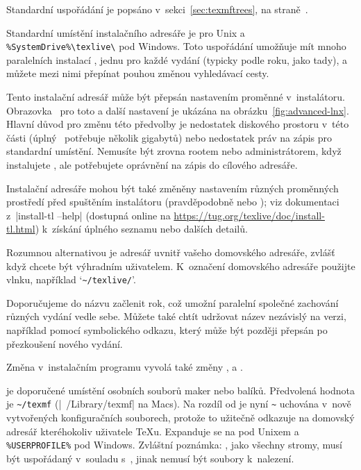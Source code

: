 \documentclass[\classoptions,slovak,english,czech]{\classname}
\def\p.{na straně~}
\begin{document}
Standardní uspořádání je popsáno v~sekci~\ref{sec:texmftrees},
\p.\pageref{sec:texmftrees}. 

Standardní umístění instalačního adresáře je
 pro Unix
a \verb|%SystemDrive%\texlive\|\dirname{\thisyear} pod Windows.
Toto uspořádání umožňuje mít mnoho paralelních instalací \TL, jednu pro každé vydání
(typicky podle roku, jako tady),
a můžete mezi nimi přepínat pouhou změnou vyhledávací cesty.

Tento instalační adresář může být přepsán nastavením proměnné  v~instalátoru.
Obrazovka \GUI\ pro toto a další nastavení je ukázána na obrázku~\ref{fig:advanced-lnx}.
Hlavní důvod pro změnu této předvolby je nedostatek diskového prostoru v~této části
(úplný \TL\ potřebuje několik gigabytů) nebo nedostatek práv
na zápis pro standardní umístění.
Nemusíte být zrovna rootem nebo administrátorem, když 
instalujete \TL, ale potřebujete oprávnění na zápis do cílového adresáře.

Instalační adresáře mohou být také změněny nastavením různých proměnných 
prostředí před spuštěním instalátoru (pravděpodobně
 nebo
); viz dokumentaci z~|install-tl --help| 
(dostupná online na
\url{https://tug.org/texlive/doc/install-tl.html}) k~získání úplného seznamu 
nebo dalších detailů.

Rozumnou alternativou je adresář uvnitř vašeho domovského
adresáře, zvlášť když chcete být výhradním uživatelem. 
K~označení domovského adresáře použijte vlnku, %
například `\verb|~/texlive/|\dirname{\thisyear}'.

Doporučujeme do názvu začlenit rok, což umožní paralelní
společné zachování různých vydání \TL{} vedle sebe. Můžete 
také chtít udržovat název nezávislý na verzi, například 
 pomocí symbolického odkazu, 
který může být později přepsán po přezkoušení nového vydání.

Změna  v~instalačním programu vyvolá také změny 
,  a
.

 je doporučené umístění osobních souborů maker
 nebo balíků.  Předvolená hodnota je \verb|~/texmf| 
 (|~/Library/texmf| na Macs). 
Na rozdíl od  je nyní \verb|~| uchována 
v~nově vytvořených konfiguračních souborech, 
protože to užitečně odkazuje na domovský adresář kteréhokoliv uživatele \TeX u. 
Expanduje se na  pod Unixem a \verb|%USERPROFILE%| pod Windows.
Zvláštní poznámka: , jako všechny
stromy, musí být uspořádaný v~souladu s~\TDS, jinak
nemusí být soubory k~nalezení.
\end{document}
